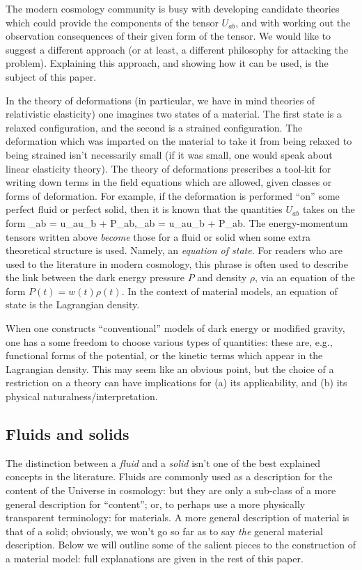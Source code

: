 The modern cosmology community is busy with developing candidate theories which could provide the components of the tensor $U_{ab}$, and with working out the observation consequences of their given form of the tensor.  We would like to suggest a different approach (or at least, a different philosophy for attacking the problem). Explaining this approach, and showing how it can be used, is the subject of this paper.

In the theory of deformations (in particular, we have in mind   theories of relativistic elasticity) one imagines two states of a material. The first state is a relaxed configuration, and the second is a strained configuration. The deformation which was imparted on the material to take it from being relaxed to being strained isn't necessarily small (if it was small, one would  speak about linear elasticity theory). The theory of deformations prescribes a tool-kit for writing down terms in the field equations which are allowed, given classes or forms of deformation. For example, if the deformation is performed ``on'' some perfect fluid or perfect solid, then it is known that the quantities $U_{ab}$ takes on the form
\bea
{}_{ab} = \rho u_au_b + P\gamma_{ab},\qquad {}_{ab} = \rho u_au_b + P_{ab}.
\eea
The energy-momentum tensors written above \textit{become} those for a fluid or solid when some extra theoretical structure is used. Namely, an \textit{equation of state}. For readers who are used to the literature in modern cosmology, this phrase is often used to describe the link between the dark energy pressure $P$ and density $\rho$, via an equation of the form $P(t) = w(t) \rho(t)$. In the context of material models, an equation of state is the Lagrangian density.

When one constructs ``conventional'' models of dark energy or modified gravity, one has a some freedom to choose various types of quantities: these are, e.g., functional forms of the potential, or the kinetic terms which appear in the Lagrangian density. This may seem like an obvious point, but the choice of a restriction on a theory can have implications for (a) its applicability, and (b) its physical naturalness/interpretation. 


\subsection{Fluids and solids}
The distinction between a \textit{fluid} and a \textit{solid} isn't one of the best explained concepts in the literature. Fluids are commonly used as a   description for the content of the Universe in cosmology: but they are only a sub-class of a more general description for ``content''; or, to perhaps use a  more physically transparent terminology: for materials. A more general  description of material is that of a solid; obviously, we won't go so far as to say \textit{the}  general material description. Below we will outline some of the salient pieces to the construction of a material model: full explanations are given in the rest of this paper.

